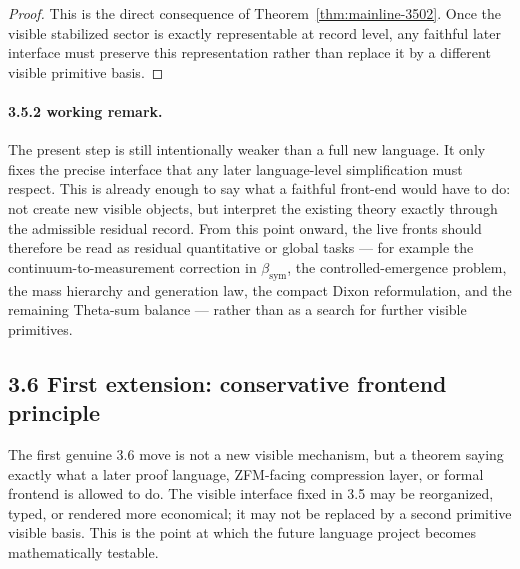 \documentclass[12pt,a4paper]{article}
\newcommand{\bsym}{\beta_{\mathrm{sym}}}
\begin{document}
\begin{proof}
This is the direct consequence of Theorem~\ref{thm:mainline-3502}. Once the visible stabilized sector is exactly representable at record level, any faithful later interface must preserve this representation rather than replace it by a different visible primitive basis.
\end{proof}

\paragraph{3.5.2 working remark.}
The present step is still intentionally weaker than a full new language. It only fixes the precise interface that any later language-level simplification must respect. This is already enough to say what a faithful front-end would have to do: not create new visible objects, but interpret the existing theory exactly through the admissible residual record. From this point onward, the live fronts should therefore be read as residual quantitative or global tasks --- for example the continuum-to-measurement correction in $\bsym$, the controlled-emergence problem, the mass hierarchy and generation law, the compact Dixon reformulation, and the remaining Theta-sum balance --- rather than as a search for further visible primitives.



\subsection*{3.6 First extension: conservative frontend principle}
The first genuine 3.6 move is not a new visible mechanism, but a theorem saying exactly what a later proof language, ZFM-facing compression layer, or formal frontend is allowed to do. The visible interface fixed in 3.5 may be reorganized, typed, or rendered more economical; it may not be replaced by a second primitive visible basis. This is the point at which the future language project becomes mathematically testable.
\end{document}
